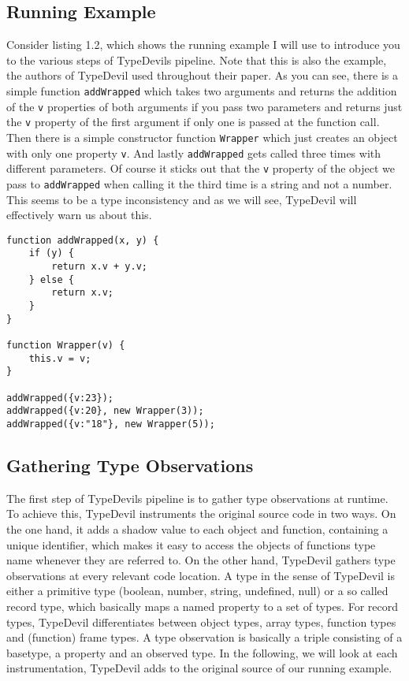 \documentclass[runningheads,a4paper]{llncs}
\begin{document}
\subsection{Running Example}
Consider listing 1.2, which shows the running example I will use to introduce you to the various steps of TypeDevils pipeline.
Note that this is also the example, the authors of TypeDevil used throughout their paper.
As you can see, there is a simple function \lstinline[columns=fixed]{addWrapped} which takes two arguments and returns the addition of the \lstinline[columns=fixed]{v} properties of both arguments if you pass two parameters and returns just the \lstinline[columns=fixed]{v} property of the first argument if only one is passed at the function call.
Then there is a simple constructor function \lstinline[columns=fixed]{Wrapper} which just creates an object with only one property \lstinline[columns=fixed]{v}.
And lastly \lstinline[columns=fixed]{addWrapped} gets called three times with different parameters.
Of course it sticks out that the \lstinline[columns=fixed]{v} property of the object we pass to \lstinline[columns=fixed]{addWrapped} when calling it the third time is a string and not a number.
This seems to be a type inconsistency and as we will see, TypeDevil will effectively warn us about this.

\lstset{language=javascript}
\begin{minipage}{\linewidth}
\begin{lstlisting}[frame=single, caption=Running Example]
function addWrapped(x, y) {
    if (y) {
        return x.v + y.v;
    } else {
        return x.v;
    }
}

function Wrapper(v) {
    this.v = v;
}

addWrapped({v:23});
addWrapped({v:20}, new Wrapper(3));
addWrapped({v:"18"}, new Wrapper(5));
\end{lstlisting}
\end{minipage}


\subsection{Gathering Type Observations}

The first step of TypeDevils pipeline is to gather type observations at runtime.
To achieve this, TypeDevil instruments the original source code in two ways.
On the one hand, it adds a shadow value to each object and function, containing a unique identifier, which makes it easy to access the objects of functions type name whenever they are referred to. 
On the other hand, TypeDevil gathers type observations at every relevant code location.
A type in the sense of TypeDevil is either a primitive type (boolean, number, string, undefined, null) or a so called record type, which basically maps a named property to a set of types.
For record types, TypeDevil differentiates between object types, array types, function types and (function) frame types.
A type observation is basically a triple consisting of a basetype, a property and an observed type.
In the following, we will look at each instrumentation, TypeDevil adds to the original source of our running example.
\end{document}
